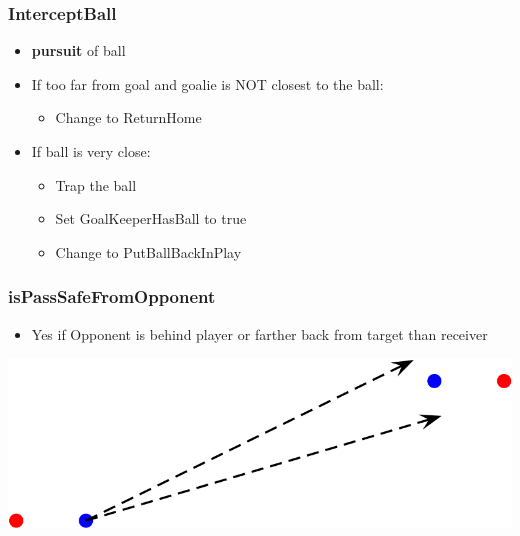 \documentclass[handout,t,compress]{beamer}
\newcommand{\bframe}[1]{\begin{frame}[fragile]\frametitle{#1}}
\begin{document}
\bframe{InterceptBall}
\begin{itemize}
\item {\bf pursuit} of ball
\item If too far from goal and goalie is NOT closest to the ball:
\begin{itemize}
\item Change to ReturnHome
\end{itemize}
\item If ball is very close:
\begin{itemize}
\item Trap the ball
\item Set GoalKeeperHasBall to true
\item Change to PutBallBackInPlay
\end{itemize}
\end{itemize}
\end{frame}

\bframe{isPassSafeFromOpponent}
\begin{itemize}
\item Yes if Opponent is behind player or farther back from target
  than receiver
\end{itemize}
\includegraphics[scale=0.25]{behind.png}
\end{frame}
\end{document}
